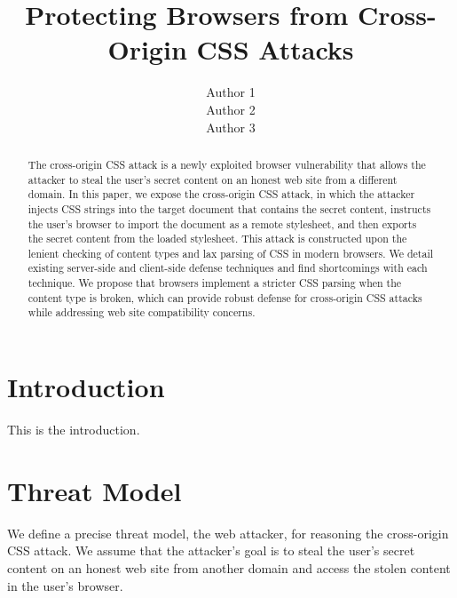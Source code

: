 \documentclass{acm_proc_article-sp}
\begin{document}
\title{Protecting Browsers from Cross-Origin CSS Attacks}

\author{
\alignauthor
Author 1\\
\alignauthor
Author 2\\
\alignauthor
Author 3\\
}

\maketitle
\begin{abstract}
The cross-origin CSS attack is a newly exploited browser vulnerability that allows the attacker to steal the user's secret content on an honest web site from a different domain. In this paper, we expose the cross-origin CSS attack, in which the attacker injects CSS strings into the target document that contains the secret content, instructs the user's browser to import the document as a remote stylesheet, and then exports the secret content from the loaded stylesheet. This attack is constructed upon the lenient checking of content types and lax parsing of CSS in modern browsers. We detail existing server-side and client-side defense techniques and find shortcomings with each technique. We propose that browsers implement a stricter CSS parsing when the content type is broken, which can provide robust defense for cross-origin CSS attacks while addressing web site compatibility concerns.
\end{abstract}




\section{Introduction}
This is the introduction.

\section{Threat Model}
We define a precise threat model, the web attacker, for reasoning the cross-origin CSS attack. We assume that the attacker's goal is to steal the user's secret content on an honest web site from another domain and access the stolen content in the user's browser.
\end{document}
